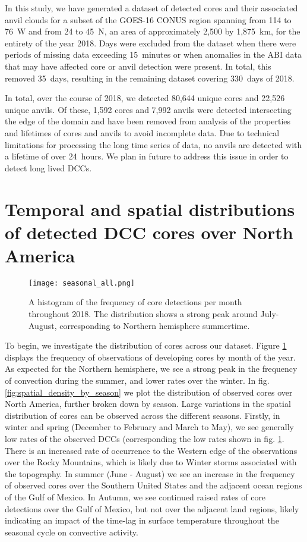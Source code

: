 In this study, we have generated a dataset of detected cores and their associated anvil clouds for a subset of the GOES-16 CONUS region spanning from 114 to 76\textdegree~W and from 24 to 45\textdegree~N, an area of approximately 2,500 by 1,875~\unit{km}, for the entirety of the year 2018.
Days were excluded from the dataset when there were periods of missing data exceeding 15~minutes or when anomalies in the ABI data that may have affected core or anvil detection were present.
In total, this removed 35~days, resulting in the remaining dataset covering 330~days of 2018.

In total, over the course of 2018, we detected 80,644 unique cores and 22,526 unique anvils.
Of these, 1,592 cores and 7,992 anvils were detected intersecting the edge of the domain and have been removed from analysis of the properties and lifetimes of cores and anvils to avoid incomplete data.
Due to technical limitations for processing the long time series of data, no anvils are detected with a lifetime of over 24~hours.
We plan in future to address this issue in order to detect long lived DCCs.


\section{Temporal and spatial distributions of detected DCC cores over North America}

\begin{figure}[t]
    \centering
    \texttt{[image: seasonal\_all.png]}
    \caption{A histogram of the frequency of core detections per month throughout 2018. The distribution shows a strong peak around July-August, corresponding to Northern hemisphere summertime.}
    \label{fig:seasonal_dist}
\end{figure}

To begin, we investigate the distribution of cores across our dataset.
Figure \ref{fig:seasonal_dist} displays the frequency of observations of developing cores by month of the year.
As expected for the Northern hemisphere, we see a strong peak in the frequency of convection during the summer, and lower rates over the winter.
In fig. \ref{fig:spatial_density_by_season} we plot the distribution of observed cores over North America, further broken down by season.
Large variations in the spatial distribution of cores can be observed across the different seasons.
Firstly, in winter and spring (December to February and March to May), we see generally low rates of the observed DCCs (corresponding the low rates shown in fig. \ref{fig:seasonal_dist}.
There is an increased rate of occurrence to the Western edge of the observations over the Rocky Mountains, which is likely due to Winter storms associated with the topography.
In summer (June - August) we see an increase in the frequency of observed cores over the Southern United States and the adjacent ocean regions of the Gulf of Mexico.
In Autumn, we see continued raised rates of core detections over the Gulf of Mexico, but not over the adjacent land regions, likely indicating an impact of the time-lag in surface temperature throughout the seasonal cycle on convective activity.

